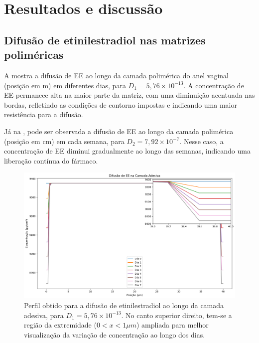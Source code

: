 \chapter{Resultados e discussão}\label{chp:resultados}

\section{Difusão de etinilestradiol nas matrizes poliméricas}

A  mostra a difusão de EE ao longo da camada polimérica do anel vaginal (posição em \textmu m) em diferentes dias, para $D_1 = 5,76 \times 10^{-13}$.  A concentração de EE permanece alta na maior parte da matriz, com uma diminuição acentuada nas bordas, refletindo as condições de contorno impostas e indicando uma maior resistência para a difusão.

Já na , pode ser observada a difusão de EE ao longo da camada polimérica (posição em cm) em cada semana, para $D_2 = 7,92 \times 10^{-7}$. Nesse caso, a concentração de EE diminui gradualmente ao longo das semanas, indicando uma liberação contínua do fármaco.

\begin{figure}[!htb]
    \centering
        \includegraphics[width=1\textwidth]{figuras/difusao_adesivo.png}
        \caption[Difusão de etinilestradiol ao longo da camada adesiva]{Perfil obtido para a difusão de etinilestradiol ao longo da camada adesiva, para $D_1 = 5,76 \times 10^{-13}$. No canto superior direito, tem-se a região da extremidade ($0 < x < 1\mu m$) ampliada para melhor visualização da variação de concentração ao longo dos dias.}
    \label{fig:difusao_adesivo}
\end{figure}

